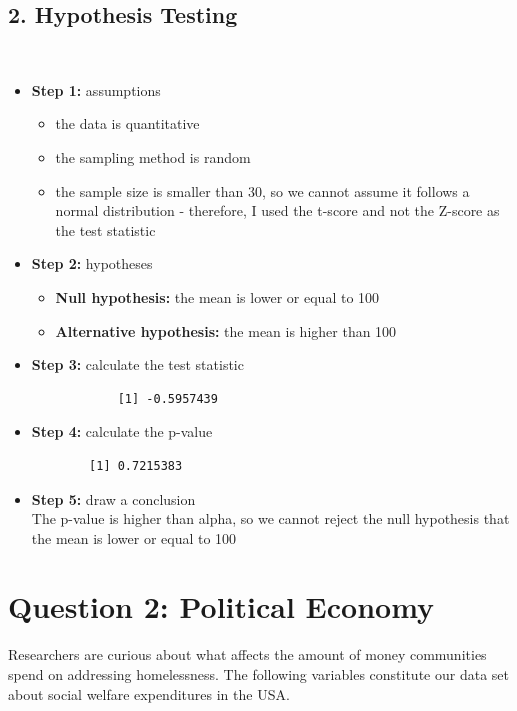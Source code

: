 \documentclass[12pt,letterpaper]{article}
\begin{document}
\subsection*{2. Hypothesis Testing}\\
\begin{itemize}
	\item \textbf{Step 1:} assumptions\\
	\begin{itemize}
		\item the data is quantitative
		\item the sampling method is random
		\item the sample size is smaller than 30, so we cannot assume it follows a normal distribution - therefore, I used the t-score and not the Z-score as the test statistic 
	\end{itemize}
	\item \textbf{Step 2:} hypotheses\\
	\begin{itemize}
		\item \textbf{Null hypothesis:} the mean is lower or equal to 100 
		\item \textbf{Alternative hypothesis:} the mean is higher than 100 
	\end{itemize}
	\item \textbf{Step 3: } calculate the test statistic\\
		 
		\begin{verbatim}
			[1] -0.5957439
		\end{verbatim}
	\item \textbf{Step 4:} calculate the p-value \\
	 
	\begin{verbatim}
		[1] 0.7215383
	\end{verbatim}
	\item \textbf{Step 5:} draw a conclusion \\
	The p-value is higher than alpha, so we cannot reject the null hypothesis that the mean is lower or equal to 100 
\end{itemize}

\newpage
	\section*{Question 2: Political Economy}

\noindent Researchers are curious about what affects the amount of money communities spend on addressing homelessness. The following variables constitute our data set about social welfare expenditures in the USA. \\
\vspace{.5cm}
\end{document}

